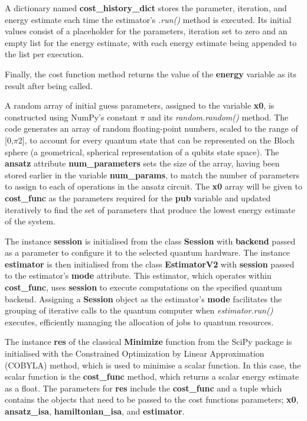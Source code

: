 \documentclass{article}
\begin{document}
{A dictionary named \textbf{cost\_history\_dict} stores the parameter, iteration, and energy estimate each time the estimator's \textit{.run()} method is executed. Its initial values consist of a placeholder for the parameters, iteration set to zero and an empty list for the energy estimate, with each energy estimate being appended to the list per execution. 

Finally, the cost function method returns the value of the \textbf{energy} variable as its result after being called.

A random array of initial guess parameters, assigned to the variable \textbf{x0}, is constructed using NumPy’s constant $\pi$ and its \textit{random.random()} method. The code generates an array of random floating-point numbers, scaled to the range of [0,$\pi$2], to account for every quantum state that can be represented on the Bloch sphere (a geometrical, spherical representation of a qubits state space\cite{blocsphere}). The \textbf{ansatz} attribute \textbf{num\_parameters} sets the size of the array, having been stored earlier in the variable \textbf{num\_params}, to match the number of parameters to assign to each of operations in the ansatz circuit. The \textbf{x0} array will be given to \textbf{cost\_func} as the parameters required for the \textbf{pub} variable and updated iteratively to find the set of parameters that produce the lowest energy estimate of the system.

The instance \textbf{session} is initialised from the class \textbf{Session} with \textbf{backend} passed as a parameter to configure it to the selected quantum hardware. The instance \textbf{estimator} is then initialised from the class \textbf{EstimatorV2} with \textbf{session} passed to the estimator's \textbf{mode} attribute. This estimator, which operates within \textbf{cost\_func}, uses \textbf{session} to execute computations on the specified quantum backend. Assigning a  \textbf{Session} object as the estimator's \textbf{mode} facilitates the grouping of iterative calls to the quantum computer when \textit{estimator.run()} executes, efficiently managing the allocation of jobs to quantum resources\cite{Session}.

The instance \textbf{res} of the classical \textbf{Minimize} function from the SciPy package is initialised with the Constrained Optimization by Linear Approximation (COBYLA) method, which is used to minimise a scalar function\cite{Minimize}. In this case, the scalar function is the \textbf{cost\_func} method, which returns a scalar energy estimate as a float. The parameters for \textbf{res} include the \textbf{cost\_func} and a tuple which contains the objects that need to be passed to the cost functions parameters; \textbf{x0}, \textbf{ansatz\_isa}, \textbf{hamiltonian\_isa}, and \textbf{estimator}.

}
\end{document}
